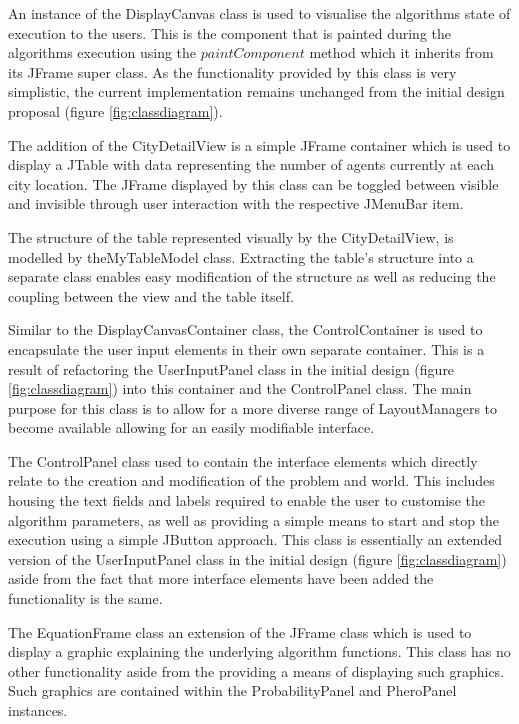 An instance of the DisplayCanvas class is used to visualise the algorithms state of execution to the users. This is the component that is painted during the algorithms execution using the $paintComponent$ method which it inherits from its JFrame super class. As the functionality provided by this class is very simplistic, the current implementation remains unchanged from the initial design proposal (figure \ref{fig:classdiagram}).

The addition of the CityDetailView is a simple JFrame container which is used to display a JTable with data representing the number of agents currently at each city location. The JFrame displayed by this class can be toggled between visible and invisible through user interaction with the respective JMenuBar item.

The structure of the table represented visually by the CityDetailView, is modelled by theMyTableModel class. Extracting the table’s structure into a separate class enables easy modification of the structure as well as reducing the coupling between the view and the table itself.

Similar to the DisplayCanvasContainer class, the ControlContainer is used to encapsulate the user input elements in their own separate container. This is a result of refactoring the UserInputPanel class in the initial design (figure \ref{fig:classdiagram}) into this container and the ControlPanel class. The main purpose for this class is to allow for a more diverse range of LayoutManagers to become available allowing for an easily modifiable interface.

The ControlPanel class used to contain the interface elements which directly relate to the creation and modification of the problem and world. This includes housing the text fields and labels required to enable the user to customise the algorithm parameters, as well as providing a simple means to start and stop the execution using a simple JButton approach. This class is essentially an extended version of the UserInputPanel class in the initial design (figure \ref{fig:classdiagram}) aside from the fact that more interface elements have been added the functionality is the same.

The EquationFrame class an extension of the JFrame class which is used to display a graphic explaining the underlying algorithm functions. This class has no other functionality aside from the providing a means of displaying such graphics. Such graphics are contained within the ProbabilityPanel and PheroPanel instances.


